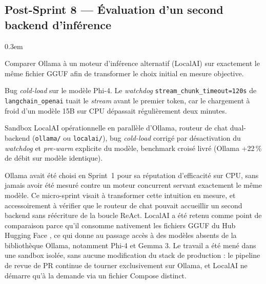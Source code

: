     \subsection{Post-Sprint 8 — Évaluation d'un second backend d'inférence}

        \begin{description}
            \itemsep 0.3em
            \item[Objectif du sprint :] Comparer Ollama à un moteur d'inférence
                alternatif (LocalAI) sur exactement le même fichier GGUF afin de
                transformer le choix initial en mesure objective.
            \item[Obstacles rencontrés :] Bug \textit{cold-load} sur le modèle
                Phi-4. Le \textit{watchdog} \texttt{stream\_\allowbreak{}chunk\_\allowbreak{}timeout=120s}
                de \texttt{langchain\_\allowbreak{}openai} tuait le \textit{stream} avant le
                premier token, car le chargement à froid d'un modèle 15B sur CPU
                dépassait régulièrement deux minutes.
            \item[Livrable :] Sandbox LocalAI opérationnelle en parallèle d'Ollama,
                routeur de chat dual-backend (\texttt{ollama/} ou \texttt{localai/}),
                bug \textit{cold-load} corrigé par désactivation du \textit{watchdog}
                et \textit{pre-warm} explicite du modèle, benchmark croisé livré
                (Ollama +22\,\% de débit sur modèle identique).
        \end{description}

        Ollama \cite{Ollama} avait été choisi en Sprint~1 pour sa réputation
        d'efficacité sur CPU, sans jamais avoir été mesuré contre un moteur
        concurrent servant exactement le même modèle. Ce micro-sprint visait à
        transformer cette intuition en mesure, et accessoirement à vérifier que le
        routeur de chat pouvait accueillir un second backend sans réécriture de la
        boucle ReAct. LocalAI \cite{LocalAI} a été retenu comme point de comparaison
        parce qu'il consomme nativement les fichiers GGUF \cite{GGUF} du Hub Hugging
        Face \cite{HuggingFaceHub}, ce qui donne au passage accès à des modèles
        absents de la bibliothèque Ollama, notamment Phi-4 et Gemma 3. Le travail a
        été mené dans une sandbox isolée, sans aucune modification du stack de
        production : le pipeline de revue de PR continue de tourner exclusivement sur
        Ollama, et LocalAI ne démarre qu'à la demande via un fichier Compose
        distinct.

